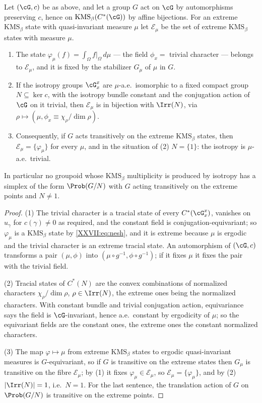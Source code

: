 \begin{theorem}\label{XXVII:thm:isoNoGo}
Let $(\cG,c)$ be as above, and let a group $G$ act on $\cG$ by automorphisms preserving $c$,
hence on $\mathrm{KMS}_\beta(C^*(\cG))$ by affine bijections. For an extreme
$\mathrm{KMS}_\beta$ state with quasi-invariant measure $\mu$ let $\mathcal E_\mu$ be the set
of extreme $\mathrm{KMS}_\beta$ states with measure $\mu$.
\begin{enumerate}
\item The state $\varphi_\mu(f)=\int_\Omega f|_\Omega\,d\mu$ --- the field $\phi_x=$ trivial
character --- belongs to $\mathcal E_\mu$, and it is fixed by the stabilizer $G_\mu$ of
$\mu$ in $G$.
\item If the isotropy groups $\cG_x^x$ are $\mu$-a.e.\ isomorphic to a fixed compact group
$N\subseteq\ker c$, with the isotropy bundle constant and the conjugation action of $\cG$
on it trivial, then $\mathcal E_\mu$ is in bijection with $\Irr(N)$, via
$\rho\mapsto(\mu,\phi_x\equiv\chi_\rho/\dim\rho)$.
\item Consequently, if $G$ acts transitively on the extreme $\mathrm{KMS}_\beta$ states, then
$\mathcal E_\mu=\{\varphi_\mu\}$ for every $\mu$, and in the situation of (2) $N=\{1\}$: the
isotropy is $\mu$-a.e.\ trivial.
\end{enumerate}
In particular no groupoid whose $\mathrm{KMS}_\beta$ multiplicity is produced by isotropy
has a simplex of the form $\Prob(G/N)$ with $G$ acting transitively on the extreme points
and $N\ne1$.
\end{theorem}

\begin{proof}
(1) The trivial character is a tracial state of every $C^*(\cG_x^x)$, vanishes on $u_\gamma$
for $c(\gamma)\ne0$ as required, and the constant field is conjugation-equivariant; so
$\varphi_\mu$ is a $\mathrm{KMS}_\beta$ state by \eqref{XXVII:eq:nesh}, and it is extreme because
$\mu$ is ergodic and the trivial character is an extreme tracial state. An automorphism of
$(\cG,c)$ transforms a pair $(\mu,\phi)$ into $(\mu\circ g^{-1},\phi\circ g^{-1})$; if it
fixes $\mu$ it fixes the pair with the trivial field.

(2) Tracial states of $C^*(N)$ are the convex combinations of normalized characters
$\chi_\rho/\dim\rho$, $\rho\in\Irr(N)$, the extreme ones being the normalized characters.
With constant bundle and trivial conjugation action, equivariance says the field is
$\cG$-invariant, hence a.e.\ constant by ergodicity of $\mu$; so the equivariant fields
are the constant ones, the extreme ones the constant normalized characters.

(3) The map $\varphi\mapsto\mu$ from extreme $\mathrm{KMS}_\beta$ states to ergodic
quasi-invariant measures is $G$-equivariant, so if $G$ is transitive on the extreme states
then $G_\mu$ is transitive on the fibre $\mathcal E_\mu$; by (1) it fixes $\varphi_\mu\in\mathcal E_\mu$,
so $\mathcal E_\mu=\{\varphi_\mu\}$, and by (2) $|\Irr(N)|=1$, i.e.\ $N=1$. For the last
sentence, the translation action of $G$ on $\Prob(G/N)$ is transitive on the extreme
points.
\end{proof}

